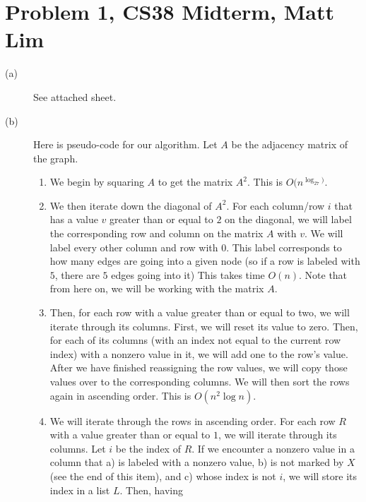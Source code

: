 \documentclass{article}
\begin{document}
\section*{Problem 1, CS38 Midterm, Matt Lim}
\begin{description}
    \item[(a)]
        See attached sheet.
    \item[(b)]
        Here is pseudo-code for our algorithm. Let $A$ be the adjacency matrix
        of the graph.
        \begin{enumerate}
            \item
                We begin by squaring $A$ to get the matrix $A^2$. This is
                $O(n^{\log _27)}$.
            \item
                We then iterate down the diagonal of $A^2$. For each column/row
                $i$ that has a value $v$ greater than or equal to $2$ on the
                diagonal, we will label the corresponding row and column on the
                matrix $A$ with $v$. We will label every other column and row
                with $0$. This label corresponds to how many edges are going
                into a given node (so if a row is labeled with $5$,  there are
                $5$ edges going into it)
                This takes time $O(n)$. Note that from here on, we
                will be working with the matrix $A$.
            \item Then, for each row with a value greater than or equal to two, we will iterate
                through its columns. First, we will reset its value to zero.
                Then, for each of its columns (with an index not equal to
                the current row index) with a nonzero value in it, we will
                add one to the row's value. After we have finished reassigning
                the row values, we will copy those values over to the
                corresponding columns. We will then sort the rows
                again in ascending order. This is $O(n^2\log n)$.
            \item
                We will iterate through the rows in ascending order. For each
                row $R$ with a value greater than or equal to $1$, we will iterate
                through its columns. Let $i$ be the index of $R$. If we encounter a
                nonzero value in a column
                that a) is labeled with a nonzero value, b) is not marked by $X$
                (see the end of this item), and c) whose
                index is not $i$, we will store its index in a list $L$. Then, having

\end{enumerate}
\end{description}
\end{document}
